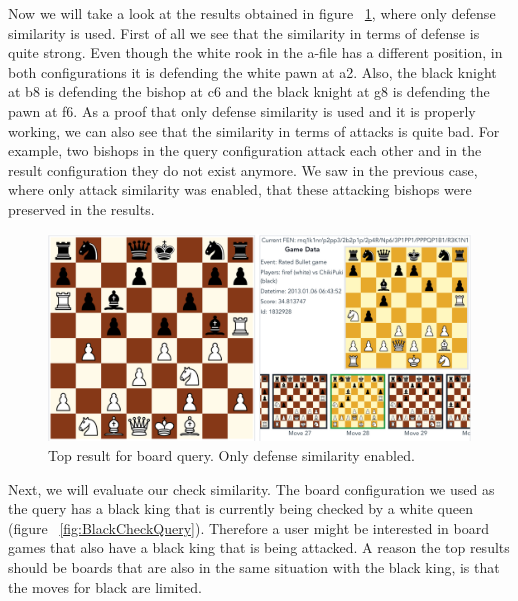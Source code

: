 \documentclass[11pt]{article}
\begin{document}
    Now we will take a look at the results obtained in figure ~\ref{fig:Defense}, where only defense similarity is used. First of all we see that the similarity in terms of defense is quite strong. Even though the white rook in the a-file has a different position, in both configurations it is defending the white pawn at a2. Also, the black knight at b8 is defending the bishop at c6 and the black knight at g8 is defending the pawn at f6. As a proof that only defense similarity is used and it is properly working, we can also see that the similarity in terms of attacks is quite bad. For example, two bishops in the query configuration attack each other and in the result configuration they do not exist anymore. We saw in the previous case, where only attack similarity was enabled, that these attacking bishops were preserved in the results.

    \begin{figure}[H]
        \centering
        \includegraphics[width=12cm]{images/Defense}
        \caption{Top result for board query. Only defense similarity enabled.}
        \label{fig:Defense}
    \end{figure}

    Next, we will evaluate our check similarity. The board configuration we used as the query has a black king that is currently being checked by a white queen (figure ~\ref{fig:BlackCheckQuery}). Therefore a user might be interested in board games that also have a black king that is being attacked. A reason the top results should be boards that are also in the same situation with the black king, is that the moves for black are limited.
\end{document}
